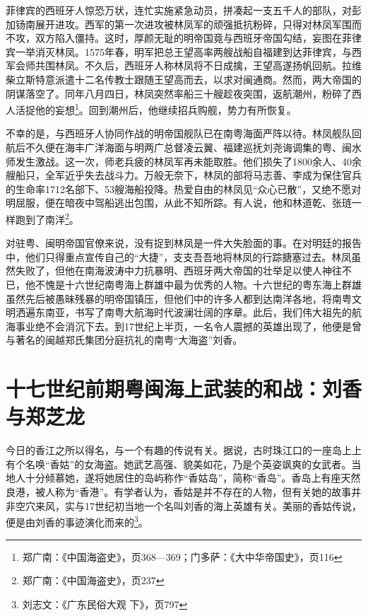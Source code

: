 菲律宾的西班牙人惊恐万状，连忙实施紧急动员，拼凑起一支五千人的部队，对彭加钖南展开进攻。西军的第一次进攻被林凤军的顽强抵抗粉碎，只得对林凤军围而不攻，双方陷入僵持。这时，厚颜无耻的明帝国竟与西班牙帝国勾结，妄图在菲律宾一举消灭林凤。1575年春，明军把总王望高率两艘战船自福建到达菲律宾，与西军会师共围林凤。不久后，西班牙人称林凤将不日成擒，王望高遂扬帆回航。拉维柴立斯特意派遣十二名传教士跟随王望高而去，以求对闽通商。然而，两大帝国的阴谋落空了。同年八月四日，林凤突然率船三十艘趁夜突围，返航潮州，粉碎了西人活捉他的妄想\footnote{郑广南：《中国海盗史》，页368—369；门多萨：《大中华帝国史》，页116}。回到潮州后，他继续招兵购舰，势力有所恢复。

不幸的是，与西班牙人协同作战的明帝国舰队已在南粤海面严阵以待。林凤舰队回航后不久便在海丰广洋海面与明两广总督凌云翼、福建巡抚刘尧诲调集的粤、闽水师发生激战。这一次，师老兵疲的林凤军再未能取胜。他们损失了1800余人、40余艘船只，全军近乎失去战斗力。万般无奈下，林凤的部将马志善、李成为保住官兵的生命率1712名部下、53艘海船投降。热爱自由的林凤见“众心已散”，又绝不愿对明屈服，便在暗夜中驾船逃出包围，从此不知所踪。有人说，他和林道乾、张琏一样跑到了南洋\footnote{郑广南：《中国海盗史》，页237}。

对驻粤、闽明帝国官僚来说，没有捉到林凤是一件大失脸面的事。在对明廷的报告中，他们只得重点宣传自己的“大捷”，支支吾吾地将林凤的行踪搪塞过去。林凤虽然失败了，但他在南海波涛中力抗暴明、西班牙两大帝国的壮举足以使人神往不已，他不愧是十六世纪南粤海上群雄中最为优秀的人物。十六世纪的粤东海上群雄虽然先后被愚昧残暴的明帝国镇压，但他们中的许多人都到达南洋各地，将南粤文明洒遍东南亚，书写了南粤大航海时代波澜壮阔的序章。此后，我们伟大祖先的航海事业绝不会消沉下去。到17世纪上半页，一名令人震撼的英雄出现了，他便是曾与著名的闽越郑氏集团分庭抗礼的南粤“大海盗”刘香。

\section{十七世纪前期粤闽海上武装的和战：刘香与郑芝龙}

\indent 今日的香江之所以得名，与一个有趣的传说有关。据说，古时珠江口的一座岛上上有个名唤“香姑”的女海盗。她武艺高强、貌美如花，乃是个英姿飒爽的女武者。当地人十分倾慕她，遂将她居住的岛屿称作“香姑岛”，简称“香岛”。香岛上有座天然良港，被人称为“香港”。有学者认为，香姑是并不存在的人物，但有关她的故事并非空穴来风，实与17世纪初当地一个名叫刘香的海上英雄有关。美丽的香姑传说，便是由刘香的事迹演化而来的\footnote{刘志文：《广东民俗大观 下》，页797}。

